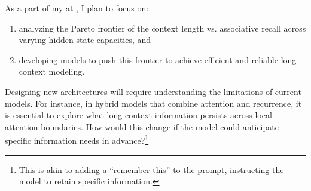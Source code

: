 As a part of my \thedegree at \thecollegeabbr, I plan to focus on:
\begin{enumerate}[itemsep=-2pt, topsep=-1pt]
    \item analyzing the Pareto frontier of the context length vs. associative recall across varying hidden-state capacities, and
    
    \item developing models to push this frontier to achieve efficient and reliable long-context modeling.
\end{enumerate}
Designing new architectures will require understanding the limitations of current models. For instance, in hybrid models that combine attention and recurrence, it is essential to explore what long-context information persists across local attention boundaries. How would this change if the model could anticipate specific information needs in advance?\footnote{This is akin to adding a ``remember this'' to the prompt, instructing the model to retain specific information.}

\par